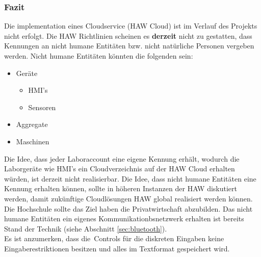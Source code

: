 




\FloatBarrier

\subsubsection{Fazit}

Die implementation eines Cloudservice (HAW Cloud) ist im Verlauf des Projekts nicht erfolgt. Die HAW Richtlinien scheinen es \textbf{derzeit} nicht zu gestatten, dass Kennungen an nicht humane Entitäten bzw. nicht natürliche Personen vergeben werden. Nicht humane Entitäten könnten die folgenden sein:
 
\begin{itemize}
\item Geräte
\begin{itemize}
\item HMI's 
\item Sensoren
\end{itemize} 
\item Aggregate
\item Maschinen
\end{itemize}

Die Idee, dass jeder Laboraccount eine eigene Kennung erhält, wodurch die Laborgeräte wie HMI's ein Cloudverzeichnis auf der HAW Cloud erhalten würden, ist derzeit nicht realisierbar. Die Idee, dass nicht humane Entitäten eine Kennung erhalten können, sollte in höheren Instanzen der HAW diskutiert werden, damit zukünftige Cloudlösungen HAW global realisiert werden können. Die Hochschule sollte das Ziel haben die Privatwirtschaft abzubilden. Das nicht humane Entitäten ein eigenes Kommunikationbsnetzwerk erhalten ist bereits Stand der Technik (siehe Abschnitt \ref{sec:bluetooth}). \\

Es ist anzumerken, dass die \,{\Menlo Controls} für die diskreten Eingaben keine Eingaberestriktionen besitzen und alles im Textformat gespeichert wird.

\pagebreak